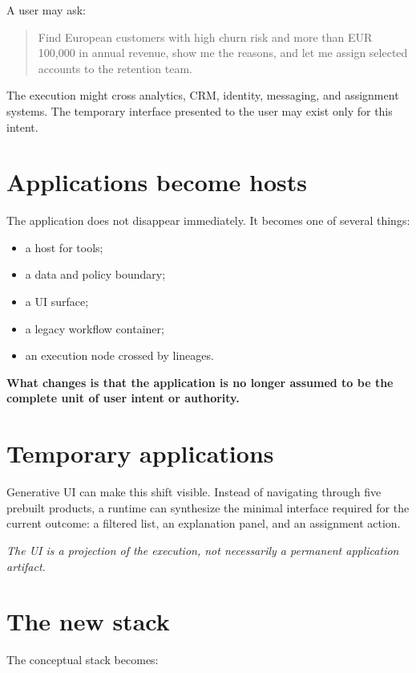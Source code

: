 \documentclass[10pt,oneside,openany]{book}
\begin{document}
A user may ask:

\begin{quote}
Find European customers with high churn risk and more than EUR 100,000 in annual revenue, show me the reasons, and let me assign selected accounts to the retention team.
\end{quote}

The execution might cross analytics, CRM, identity, messaging, and assignment systems. The temporary interface presented to the user may exist only for this intent.

\section{Applications become hosts}
The application does not disappear immediately. It becomes one of several things:

\begin{itemize}
\item a host for tools;
\item a data and policy boundary;
\item a UI surface;
\item a legacy workflow container;
\item an execution node crossed by lineages.
\end{itemize}

\textbf{What changes is that the application is no longer assumed to be the complete unit of user intent or authority.}

\section{Temporary applications}
Generative UI can make this shift visible. Instead of navigating through five prebuilt products, a runtime can synthesize the minimal interface required for the current outcome: a filtered list, an explanation panel, and an assignment action.

\emph{The UI is a projection of the execution, not necessarily a permanent application artifact.}

\section{The new stack}
The conceptual stack becomes:
\end{document}
